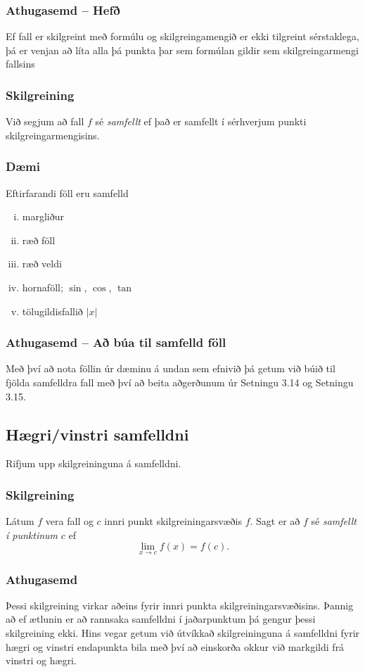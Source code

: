 \documentclass[icelandic,a4paper,12pt]{article}
\begin{document}
\subsubsection{Athugasemd -- Hefð}
Ef fall er skilgreint með formúlu og skilgreingamengið er ekki
tilgreint sérstaklega, þá er venjan að líta alla þá punkta þar
sem formúlan gildir sem skilgreingarmengi fallsins
 
\subsubsection{Skilgreining}\label{skilgr:samfellt_fall}
 Við segjum að fall $f$ sé \emph{samfellt} ef það er samfellt í sérhverjum
punkti skilgreingarmengisins.

\subsubsection{Dæmi}
Eftirfarandi föll eru samfelld
\begin{enumerate}[(i)] 
\pause
  \item margliður
\pause
  \item ræð föll
\pause
  \item ræð veldi
\pause
  \item hornaföll; $\sin$, $\cos$, $\tan$
\pause
  \item tölugildisfallið $|x|$
\end{enumerate}

\subsubsection{Athugasemd -- Að búa til samfelld föll}
Með því að nota föllin úr dæminu á undan sem efnivið þá getum við búið til 
fjölda samfelldra fall með því að beita aðgerðunum úr Setningu 3.14 og 
Setningu 3.15.

\subsection{Hægri/vinstri samfelldni}	
Rifjum upp skilgreininguna á samfelldni.
\subsubsection{Skilgreining}
Látum $f$ vera fall og $c$ innri punkt skilgreiningarsvæðis $f$.  Sagt
er að $f$ sé \emph{samfellt í punktinum} $c$ ef
$$\lim_{x\rightarrow c}f(x)=f(c).$$
 
\pause
\subsubsection{Athugasemd}
Þessi skilgreining virkar aðeins fyrir innri punkta skilgreiningarsvæðisins.
Þannig að ef ætlunin er að rannsaka samfelldni í jaðarpunktum þá gengur
þessi skilgreining ekki. Hins vegar getum við útvíkkað skilgreininguna á samfelldni fyrir 
hægri og vinstri endapunkta bila með því að einskorða okkur
við markgildi frá vinstri og hægri.
\end{document}
